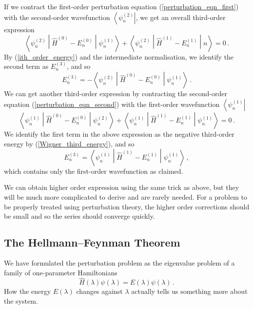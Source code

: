 \documentclass{article}
\theoremstyle{plain}\theoremheaderfont{\normalfont\itshape}\theorembodyfont{\rmfamily}\theoremseparator{.}\newtheorem*{rem}{Remark}\newtheorem*{ex}{Example}\newtheorem*{proof}{Proof}\newtheorem*{altp}{Alternative proof}
\theoremstyle{plain}\theoremheaderfont{\normalfont\bfseries}\theorembodyfont{\rmfamily}\theoremseparator{.}\newtheorem{thm}{Theorem}[section]\newtheorem{lem}[thm]{Lemma}\newtheorem{prop}[thm]{Proposition}\newtheorem*{cor}{Corollary}\newtheorem{defn}[thm]{Definition}\newtheorem{clm}[thm]{Claim}\newtheorem{clminproof}{Claim}
\theoremstyle{break}\theoremheaderfont{\normalfont\itshape}\theorembodyfont{\rmfamily}\theoremseparator{.\medskip}\newtheorem*{proofskip}{Proof}\newtheorem*{exs}{Examples}\newtheorem*{rems}{Remarks}
\theoremstyle{break}\theoremheaderfont{\normalfont\bfseries}\theorembodyfont{\rmfamily}\theoremseparator{.\medskip}\newtheorem{lemskip}[thm]{Lemma}\newtheorem{defnskip}[thm]{Definition}\newtheorem{propskip}[thm]{Proposition}\newtheorem{thmskip}[thm]{Theorem}
\numberwithin{equation}{section}
\newcommand{\bra}[1]{\left\langle #1 \right|}
\newcommand{\mel}[3]{\left\langle #1 \middle| #2 \middle| #3 \right\rangle}
\newcommand{\expval}[2]{\left\langle #2 \middle| #1 \middle| #2 \right\rangle}
\begin{document}
    If we contract the first-order perturbation equation (\ref{perturbation_eqn_first}) with the second-order wavefunction \(\bra{\psi_n^{(2)}}\), we get an overall third-order expression
    \begin{equation}
        \mel{\psi_n^{(2)}}{\hat{H}^{(0)}-E_n^{(0)}}{\psi_n^{(1)}}+\mel{\psi_n^{(2)}}{\hat{H}^{(1)}-E_n^{(1)}}{n}=0\,.
    \end{equation}
    By (\ref{ith_order_energy}) and the intermediate normalisation, we identify the second term as \(E_n^{(3)}\), and so
    \begin{equation}\label{Wigner_third_energy}
        E_n^{(3)}=-\mel{\psi_n^{(2)}}{\hat{H}^{(0)}-E_n^{(0)}}{\psi_n^{(1)}}\,.
    \end{equation}
    We can get another third-order expression by contracting the second-order equation (\ref{perturbation_eqn_second}) with the first-order wavefunction \(\bra{\psi_n^{(1)}}\)
    \begin{equation}
        \mel{\psi_n^{(1)}}{\hat{H}^{(0)}-E_n^{(0)}}{\psi_n^{(2)}}+\mel{\psi_n^{(1)}}{\hat{H}^{(1)}-E_n^{(1)}}{\psi_n^{(1)}}=0\,.
    \end{equation}
    We identify the first term in the above expression as the negative third-order energy by (\ref{Wigner_third_energy}), and so
    \begin{equation}
        E_n^{(3)}=\expval{\hat{H}^{(1)}-E_n^{(1)}}{\psi_n^{(1)}}\,,
    \end{equation}
    which contains only the first-order wavefunction as claimed.

    We can obtain higher order expression using the same trick as above, but they will be much more complicated to derive and are rarely needed. For a problem to be properly treated using perturbation theory, the higher order corrections should be small and so the series should converge quickly.

    \subsection{The Hellmann--Feynman Theorem}
    We have formulated the perturbation problem as the eigenvalue problem of a family of one-parameter Hamiltonians
    \begin{equation}
        \hat{H}(\lambda)\psi(\lambda)=E(\lambda)\psi(\lambda)\,.
    \end{equation}
    How the energy \(E(\lambda)\) changes against \(\lambda\) actually tells us something more about the system.
\end{document}
